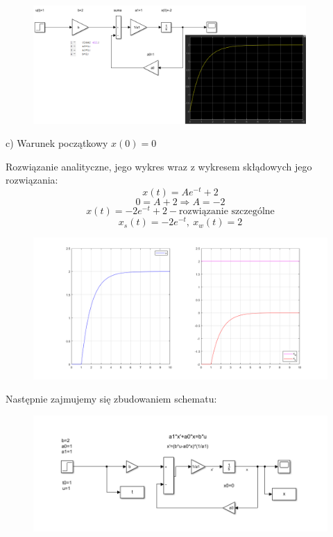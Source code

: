 \documentclass{article}
\begin{document}
\begin{figure}[h!]
    \centering
    \includegraphics[width=0.928\textwidth]{./Screeny/symulacja3B.png}
    \label{fig:my_label}
\end{figure}

\newpage



\begin{flushleft}
c) Warunek początkowy $x(0)=0$\\

\end{flushleft}
Rozwiązanie analityczne, jego wykres wraz z wykresem skłądowych jego rozwiązania:\\
$$
x(t)=Ae^{-t}+2
$$
$$
0=A+2 \Rightarrow A=-2
$$
$$
x(t)=-2e^{-t}+2-\text{rozwiązanie szczególne}
$$
$$
x_s(t)=-2e^{-t}, \  x_w(t)=2
$$

\begin{figure}[h!]
    \centering
    \includegraphics[width=\textwidth]{./Screeny/x_0.png}
    \label{fig:my_label}
\end{figure}
Następnie zajmujemy się zbudowaniem schematu:\\
\begin{figure}[h!]
    \centering
    \includegraphics[width=\textwidth]{./Screeny/schemat_0w.png}
    \label{fig:my_label}
\end{figure}
\end{document}
